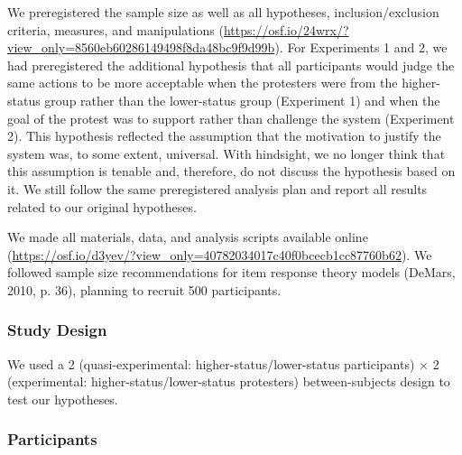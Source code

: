 \documentclass[12pt, letterpaper]{article}
\begin{document}
We preregistered the sample size as well as all hypotheses,
inclusion/exclusion criteria, measures, and manipulations
(\url{https://osf.io/24wrx/?view_only=8560eb60286149498f8da48bc9f9d99b}).
For Experiments 1 and 2, we had preregistered the additional hypothesis
that all participants would judge the same actions to be more acceptable
when the protesters were from the higher-status group rather than the
lower-status group (Experiment 1) and when the goal of the protest was
to support rather than challenge the system (Experiment 2). This
hypothesis reflected the assumption that the motivation to justify the
system was, to some extent, universal. With hindsight, we no longer
think that this assumption is tenable and, therefore, do not discuss the
hypothesis based on it. We still follow the same preregistered analysis
plan and report all results related to our original hypotheses.

We made all materials, data, and analysis scripts available online
(\url{https://osf.io/d3yev/?view_only=40782034017c40f0bcecb1cc87760b62}).
We followed sample size recommendations for item response theory models
(DeMars, 2010, p. 36), planning to recruit 500 participants.

\hypertarget{study-design}{%
\subsubsection{Study Design}\label{study-design}}

We used a 2 (quasi-experimental: higher-status/lower-status
participants) \(\times\) 2 (experimental: higher-status/lower-status
protesters) between-subjects design to test our hypotheses.

\hypertarget{participants}{%
\subsubsection{Participants}\label{participants}}
\end{document}
